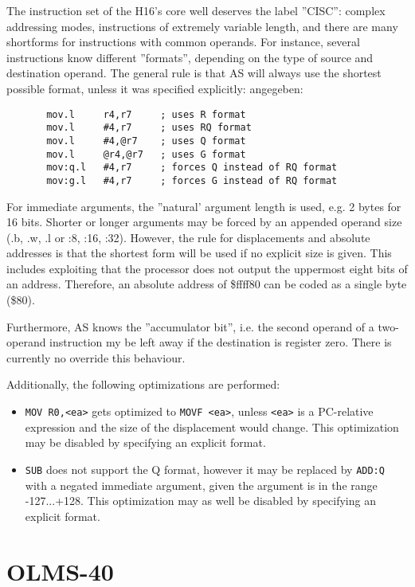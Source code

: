 \documentclass[12pt,twoside]{report}
\newcommand{\tty}[1]{{\tt #1}}
\newcommand{\asname}{{AS}}
\begin{document}
The instruction set of the H16's core well deserves the label ''CISC'': complex
addressing modes, instructions of extremely variable length, and
there are many shortforms for instructions with common operands.  For
instance, several instructions know different ''formats'', depending
on the type of source and destination operand.  The general rule is
that \asname{} will always use the shortest possible format, unless it was
specified explicitly:
angegeben:
\begin{verbatim}
       mov.l     r4,r7     ; uses R format
       mov.l     #4,r7     ; uses RQ format
       mov.l     #4,@r7    ; uses Q format
       mov.l     @r4,@r7   ; uses G format
       mov:q.l   #4,r7     ; forces Q instead of RQ format
       mov:g.l   #4,r7     ; forces G instead of RQ format
\end{verbatim}
For immediate arguments, the ''natural' argument length is used, e.g.
2 bytes for 16 bits.  Shorter or longer arguments may be forced by an
appended operand size (.b, .w, .l or :8, :16, :32).  However, the
rule for displacements and absolute addresses is that the shortest
form will be used if no explicit size is given.  This includes
exploiting that the processor does not output the uppermost eight
bits of an address.  Therefore, an absolute address of \$ffff80 can
be coded as a single byte (\$80).

Furthermore, \asname{} knows the ''accumulator bit'', i.e. the second
operand of a two-operand instruction my be left away if the
destination is register zero.  There is currently no override this
behaviour.

Additionally, the following optimizations are performed:
\begin{itemize}
\item{\tty{MOV R0,<ea>} gets optimized to \tty{MOVF <ea>}, unless
      \tty{<ea>} is a PC-relative expression and the size of the
      displacement would change.  This optimization may be disabled
      by specifying an explicit format.}
\item{\tty{SUB} does not support the Q format, however it may be
      replaced by \tty{ADD:Q} with a negated immediate argument,
      given the argument is in the range -127...+128.  This
      optimization may as well be disabled by specifying an explicit
      format.}
\end{itemize}


\section{OLMS-40}
\end{document}
